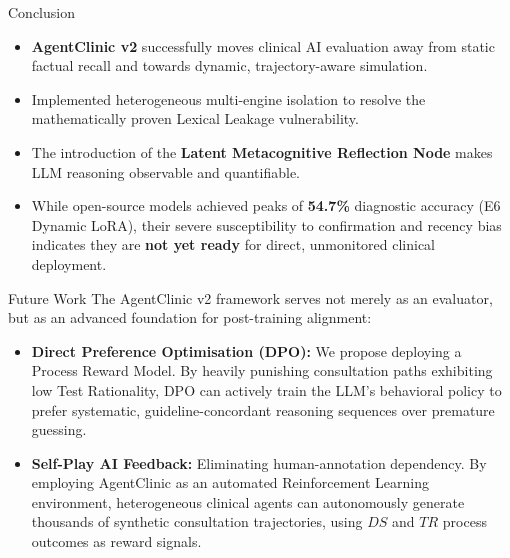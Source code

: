 \documentclass[10pt, aspectratio=169]{beamer}
\begin{document}
\begin{frame}{Conclusion}
    \begin{itemize}
        \item \textbf{AgentClinic v2} successfully moves clinical AI evaluation away from static factual recall and towards dynamic, trajectory-aware simulation.
        \item Implemented heterogeneous multi-engine isolation to resolve the mathematically proven Lexical Leakage vulnerability.
        \item The introduction of the \textbf{Latent Metacognitive Reflection Node} makes LLM reasoning observable and quantifiable.
        \item While open-source models achieved peaks of \textbf{54.7\%} diagnostic accuracy (E6 Dynamic LoRA), their severe susceptibility to confirmation and recency bias indicates they are \textbf{not yet ready} for direct, unmonitored clinical deployment. 
    \end{itemize}
\end{frame}

\begin{frame}{Future Work}
    The AgentClinic v2 framework serves not merely as an evaluator, but as an advanced foundation for post-training alignment:
    \vspace{0.3cm}
    \begin{itemize}
        \item \textbf{Direct Preference Optimisation (DPO):} We propose deploying a Process Reward Model. By heavily punishing consultation paths exhibiting low Test Rationality, DPO can actively train the LLM's behavioral policy to prefer systematic, guideline-concordant reasoning sequences over premature guessing.
        \item \textbf{Self-Play AI Feedback:} Eliminating human-annotation dependency. By employing AgentClinic as an automated Reinforcement Learning environment, heterogeneous clinical agents can autonomously generate thousands of synthetic consultation trajectories, using $DS$ and $TR$ process outcomes as reward signals.
    \end{itemize}
\end{frame}
\end{document}
